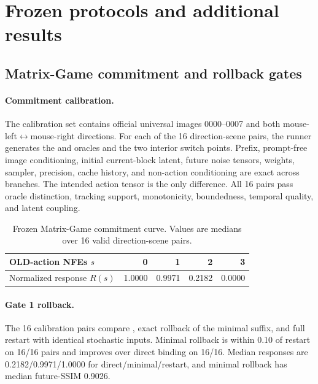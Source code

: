 \section{Frozen protocols and additional results}
\label{app:protocols}

\subsection{Matrix-Game commitment and rollback gates}

\paragraph{Commitment calibration.}
The calibration set contains official universal images 0000--0007 and both
mouse-left$\leftrightarrow$mouse-right directions. For each of the 16
direction-scene pairs, the runner generates the \new{} and \old{} oracles and
the two interior switch points. Prefix, prompt-free image conditioning, initial
current-block latent, future noise tensors, weights, sampler, precision, cache
history, and non-action conditioning are exact across branches. The intended
action tensor is the only difference. All 16 pairs pass oracle distinction,
tracking support, monotonicity, boundedness, temporal quality, and latent
coupling.

\begin{table}[h]
  \centering
  \caption{Frozen Matrix-Game commitment curve. Values are medians over 16
  valid direction-scene pairs.}
  \small
  \begin{tabular}{lrrrr}
    \toprule
    OLD-action NFEs $s$ & 0 & 1 & 2 & 3 \\
    \midrule
    Normalized response $R(s)$ & 1.0000 & 0.9971 & 0.2182 & 0.0000 \\
    \bottomrule
  \end{tabular}
\end{table}

\paragraph{Gate 1 rollback.}
The 16 calibration pairs compare \direct{}, exact rollback of the minimal
suffix, and full restart with identical stochastic inputs. Minimal rollback is within 0.10 of
restart on 16/16 pairs and improves over direct binding on 16/16. Median
responses are 0.2182/0.9971/1.0000 for direct/minimal/restart, and minimal
rollback has median future-SSIM 0.9026.

